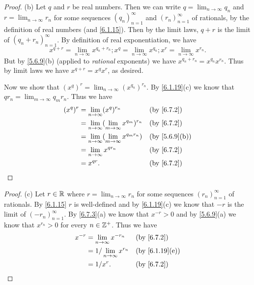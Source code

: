 \begin{proof}{(b)}
  Let \(q\) and \(r\) be real numbers.
  Then we can write \(q = \lim_{n \to \infty} q_n\) and \(r = \lim_{n \to \infty} r_n\) for some sequences \((q_n)_{n = 1}^\infty\) and \((r_n)_{n = 1}^\infty\) of rationals, by the definition of real numbers (and \cref{6.1.15}).
  Then by the limit laws, \(q + r\) is the limit of \((q_n + r_n)_{n = 1}^\infty\).
  By definition of real exponentiation, we have
  \[
    x^{q + r} = \lim_{n \to \infty} x^{q_n + r_n} ; x^q = \lim_{n \to \infty} x^{q_n} ;  x^r = \lim_{n \to \infty} x^{r_n}.
  \]
  But by \cref{5.6.9}(b) (applied to \emph{rational} exponents) we have \(x^{q_n + r_n} = x^{q_n} x^{r_n}\).
  Thus by limit laws we have \(x^{q + r} = x^q x^r\), as desired.

  Now we show that \((x^q)^r = \lim_{n \to \infty} (x^{q_n})^{r_n}\).
  By \cref{6.1.19}(c) we know that \(q r_n = \lim_{m \to \infty} q_m r_n\).
  Thus we have
  \begin{align*}
    (x^q)^r & = \lim_{n \to \infty} (x^q)^{r_n}                         &  & \by{6.7.2}                  \\
            & = \lim_{n \to \infty} (\lim_{m \to \infty} x^{q_m})^{r_n} &  & \by{6.7.2}                  \\
            & = \lim_{n \to \infty} (\lim_{m \to \infty} x^{q_m r_n})   &  & \text{(by \cref{5.6.9}(b))} \\
            & = \lim_{n \to \infty} x^{q r_n}                           &  & \by{6.7.2}                  \\
            & = x^{qr}.                                                 &  & \by{6.7.2}
  \end{align*}
\end{proof}

\begin{proof}{(c)}
  Let \(r \in \mathbb{R}\) where \(r = \lim_{n \to \infty} r_n\) for some sequences \((r_n)_{n = 1}^\infty\) of rationals.
  By \cref{6.1.15} \(r\) is well-defined and by \cref{6.1.19}(c) we know that \(-r\) is the limit of \((-r_n)_{n = 1}^\infty\).
  By \cref{6.7.3}(a) we know that \(x^{-r} > 0\) and by \cref{5.6.9}(a) we know that \(x^{r_n} > 0\) for every \(n \in \mathbb{Z}^+\).
  Thus we have
  \begin{align*}
    x^{-r} & = \lim_{n \to \infty} x^{-r_n}    &  & \by{6.7.2}                   \\
           & = 1 / \lim_{n \to \infty} x^{r_n} &  & \text{(by \cref{6.1.19}(e))} \\
           & = 1 / x^r.                        &  & \by{6.7.2}
  \end{align*}
\end{proof}

